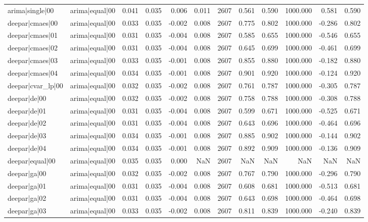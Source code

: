 \begin{table}
\begin{tabular}{llrrrrrrrrrr}
arima|single|00 & arima|equal|00 & 0.041 & 0.035 & 0.006 & 0.011 & 2607 & 0.561 & 0.590 & 1000.000 & 0.581 & 0.590 \\
deepar|cmaes|00 & arima|equal|00 & 0.033 & 0.035 & -0.002 & 0.008 & 2607 & 0.775 & 0.802 & 1000.000 & -0.286 & 0.802 \\
deepar|cmaes|01 & arima|equal|00 & 0.031 & 0.035 & -0.004 & 0.008 & 2607 & 0.585 & 0.655 & 1000.000 & -0.546 & 0.655 \\
deepar|cmaes|02 & arima|equal|00 & 0.031 & 0.035 & -0.004 & 0.008 & 2607 & 0.645 & 0.699 & 1000.000 & -0.461 & 0.699 \\
deepar|cmaes|03 & arima|equal|00 & 0.033 & 0.035 & -0.001 & 0.008 & 2607 & 0.855 & 0.880 & 1000.000 & -0.182 & 0.880 \\
deepar|cmaes|04 & arima|equal|00 & 0.034 & 0.035 & -0.001 & 0.008 & 2607 & 0.901 & 0.920 & 1000.000 & -0.124 & 0.920 \\
deepar|cvar\_lp|00 & arima|equal|00 & 0.032 & 0.035 & -0.002 & 0.008 & 2607 & 0.761 & 0.787 & 1000.000 & -0.305 & 0.787 \\
deepar|de|00 & arima|equal|00 & 0.032 & 0.035 & -0.002 & 0.008 & 2607 & 0.758 & 0.788 & 1000.000 & -0.308 & 0.788 \\
deepar|de|01 & arima|equal|00 & 0.031 & 0.035 & -0.004 & 0.008 & 2607 & 0.599 & 0.671 & 1000.000 & -0.525 & 0.671 \\
deepar|de|02 & arima|equal|00 & 0.031 & 0.035 & -0.004 & 0.008 & 2607 & 0.643 & 0.696 & 1000.000 & -0.464 & 0.696 \\
deepar|de|03 & arima|equal|00 & 0.034 & 0.035 & -0.001 & 0.008 & 2607 & 0.885 & 0.902 & 1000.000 & -0.144 & 0.902 \\
deepar|de|04 & arima|equal|00 & 0.034 & 0.035 & -0.001 & 0.008 & 2607 & 0.892 & 0.909 & 1000.000 & -0.136 & 0.909 \\
deepar|equal|00 & arima|equal|00 & 0.035 & 0.035 & 0.000 & NaN & 2607 & NaN & NaN & NaN & NaN & NaN \\
deepar|ga|00 & arima|equal|00 & 0.032 & 0.035 & -0.002 & 0.008 & 2607 & 0.767 & 0.790 & 1000.000 & -0.296 & 0.790 \\
deepar|ga|01 & arima|equal|00 & 0.031 & 0.035 & -0.004 & 0.008 & 2607 & 0.608 & 0.681 & 1000.000 & -0.513 & 0.681 \\
deepar|ga|02 & arima|equal|00 & 0.031 & 0.035 & -0.004 & 0.008 & 2607 & 0.643 & 0.698 & 1000.000 & -0.464 & 0.698 \\
deepar|ga|03 & arima|equal|00 & 0.033 & 0.035 & -0.002 & 0.008 & 2607 & 0.811 & 0.839 & 1000.000 & -0.240 & 0.839 \\

\end{tabular}
\end{table}
